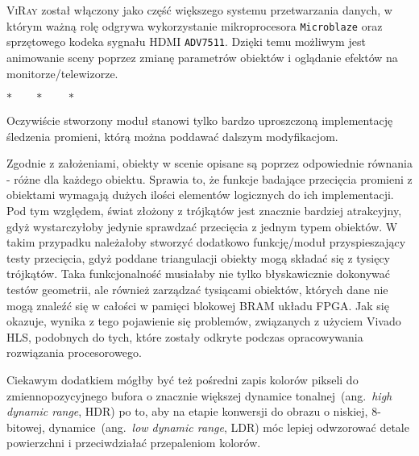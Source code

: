 \textsc{ViRay} został włączony jako część większego systemu przetwarzania danych, w którym ważną rolę odgrywa wykorzystanie mikroprocesora \texttt{Microblaze} oraz sprzętowego kodeka sygnału HDMI \texttt{ADV7511}. Dzięki temu możliwym jest animowanie sceny poprzez zmianę parametrów obiektów i oglądanie efektów na monitorze/telewizorze.

\begin{center}
$*\qquad *\qquad *$
\end{center}

Oczywiście stworzony moduł stanowi tylko bardzo uproszczoną implementację śledzenia promieni, którą można poddawać dalszym modyfikacjom. 

Zgodnie z założeniami, obiekty w scenie opisane są poprzez odpowiednie równania - różne dla każdego obiektu. Sprawia to, że funkcje badające przecięcia promieni z obiektami wymagają dużych ilości elementów logicznych do ich implementacji. Pod tym względem, świat złożony z trójkątów jest znacznie bardziej atrakcyjny, gdyż wystarczyłoby jedynie sprawdzać przecięcia z jednym typem obiektów. W takim przypadku należałoby stworzyć dodatkowo funkcję/moduł przyspieszający testy przecięcia, gdyż poddane triangulacji obiekty mogą składać się z tysięcy trójkątów. Taka funkcjonalność musiałaby nie tylko błyskawicznie dokonywać testów geometrii, ale również zarządzać tysiącami obiektów, których dane nie mogą znaleźć się w całości w pamięci blokowej BRAM układu FPGA. Jak się okazuje, wynika z tego pojawienie się problemów, związanych z użyciem Vivado HLS, podobnych do tych, które zostały odkryte podczas opracowywania rozwiązania procesorowego.

Ciekawym dodatkiem mógłby być też pośredni zapis kolorów pikseli do zmiennopozycyjnego bufora o znacznie większej dynamice tonalnej~(ang.~\textit{high dynamic range}, HDR) po to, aby na etapie konwersji do obrazu o niskiej, 8-bitowej, dynamice~(ang.~\textit{low dynamic range}, LDR) móc lepiej odwzorować detale powierzchni i przeciwdziałać przepaleniom kolorów.

